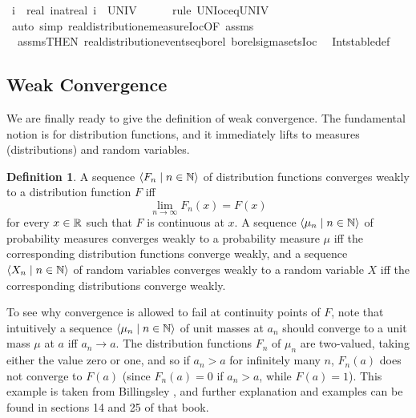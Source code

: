 \documentclass{article}
\theoremstyle{definition}
\newtheorem{definition}[theorem]{Definition}
\newcommand{\bldseq}[2]{\langle{#1}\mid{#2}\rangle}
\begin{document}
\begin{isabellebody}
\ {\isachardoublequoteopen}{\isacharparenleft}{\isasymUnion}i{\isachardot}\ {\isacharbraceleft}{\isacharminus}\ real\ {\isacharparenleft}i{\isacharcolon}{\isacharcolon}nat{\isacharparenright}{\isacharless}{\isachardot}{\isachardot}real\ i{\isacharbraceright}{\isacharparenright}\ {\isacharequal}\ UNIV{\isachardoublequoteclose}\isanewline
\ \ \ \ \isamarkupfalse%
\ {\isacharparenleft}rule\ UN{\isacharunderscore}Ioc{\isacharunderscore}eq{\isacharunderscore}UNIV{\isacharparenright}\isanewline
{}\isamarkupfalse%
\ {\isacharparenleft}auto\ simp{\isacharcolon}\ real{\isacharunderscore}distribution{\isachardot}emeasure{\isacharunderscore}Ioc{\isacharbrackleft}OF\ assms{\isacharparenleft}{}{\isacharparenright}{\isacharbrackright}\isanewline
\ \ assms{\isacharparenleft}{}{\isacharcomma}{}{\isacharparenright}{\isacharbrackleft}THEN\ real{\isacharunderscore}distribution{\isachardot}events{\isacharunderscore}eq{\isacharunderscore}borel{\isacharbrackright}\ borel{\isacharunderscore}sigma{\isacharunderscore}sets{\isacharunderscore}Ioc\isanewline
\ \ Int{\isacharunderscore}stable{\isacharunderscore}def{\isacharparenright}%
\end{isabellebody}

\subsection{Weak Convergence}

We are finally ready to give the definition of weak convergence. The fundamental notion is for distribution functions, and it immediately lifts to measures (distributions) and random variables.

\begin{definition}
A sequence $\bldseq{F_n}{n \in \N}$ of distribution functions converges weakly to a distribution function $F$ iff
\[ \lim_{n \rightarrow \infty} F_n(x) = F(x) \]
for every $x \in \mathbb{R}$ such that $F$ is continuous at $x$. A sequence $\bldseq{\mu_n}{n \in \N}$ of probability measures converges weakly to a probability measure $\mu$ iff the corresponding distribution functions converge weakly, and a sequence $\bldseq{X_n}{n \in \N}$ of random variables converges weakly to a random variable $X$ iff the corresponding distributions converge weakly.
\end{definition}

To see why convergence is allowed to fail at continuity points of $F$, note that intuitively a sequence $\bldseq{\mu_n}{n \in \N}$ of unit masses at $a_n$ should converge to a unit mass $\mu$ at $a$ iff $a_n \rightarrow a$. The distribution functions $F_n$ of $\mu_n$ are two-valued, taking either the value zero or one, and so if $a_n > a$ for infinitely many $n$, $F_n(a)$ does not converge to $F(a)$ (since $F_n(a) = 0$ if $a_n > a$, while $F(a) = 1$). This example is taken from Billingsley \cite{billingsley}, and further explanation and examples can be found in sections 14 and 25 of that book.
\end{document}

